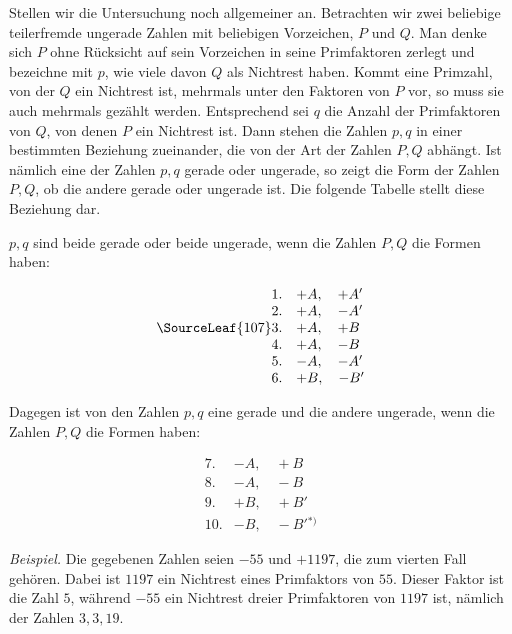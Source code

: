 Stellen wir die Untersuchung noch allgemeiner an. Betrachten wir zwei beliebige teilerfremde ungerade Zahlen mit beliebigen Vorzeichen, $P$ und $Q$. Man denke sich $P$ ohne Rücksicht auf sein Vorzeichen in seine Primfaktoren zerlegt und bezeichne mit $p$, wie viele davon $Q$ als Nichtrest haben. Kommt eine Primzahl, von der $Q$ ein Nichtrest ist, mehrmals unter den Faktoren von $P$ vor, so muss sie auch mehrmals gezählt werden. Entsprechend sei $q$ die Anzahl der Primfaktoren von $Q$, von denen $P$ ein Nichtrest ist. Dann stehen die Zahlen $p,q$ in einer bestimmten Beziehung zueinander, die von der Art der Zahlen $P,Q$ abhängt. Ist nämlich eine der Zahlen $p,q$ gerade oder ungerade, so zeigt die Form der Zahlen $P,Q$, ob die andere gerade oder ungerade ist. Die folgende Tabelle stellt diese Beziehung dar.

$p,q$ sind beide gerade oder beide ungerade, wenn die Zahlen $P,Q$ die Formen haben:

\[
\begin{array}{rl}1.&+A,\quad+A'\\2.&+A,\quad-A'\\\SourceLeaf{107}3.&+A,\quad+B\\4.&+A,\quad-B\\5.&-A,\quad-A'\\6.&+B,\quad-B'\end{array}
\]

Dagegen ist von den Zahlen $p,q$ eine gerade und die andere ungerade, wenn die Zahlen $P,Q$ die Formen haben:

\[
\begin{array}{rl}7.&-A,\quad+B\\8.&-A,\quad-B\\9.&+B,\quad+B'\\10.&-B,\quad-B'{}^{*)}\end{array}
\]


\emph{Beispiel.} Die gegebenen Zahlen seien $-55$ und $+1197$, die zum vierten Fall gehören. Dabei ist $1197$ ein Nichtrest eines Primfaktors von $55$. Dieser Faktor ist die Zahl $5$, während $-55$ ein Nichtrest dreier Primfaktoren von $1197$ ist, nämlich der Zahlen $3,3,19$.

